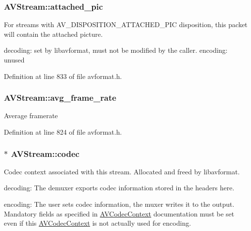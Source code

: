 \subsubsection[{\texorpdfstring{attached\+\_\+pic}{attached_pic}}]{ A\+V\+Stream\+::attached\+\_\+pic}\hypertarget{struct_a_v_stream_a8c689ee00c0dfe4313891f8a2ea21f4d}{}\label{struct_a_v_stream_a8c689ee00c0dfe4313891f8a2ea21f4d}
For streams with A\+V\+\_\+\+D\+I\+S\+P\+O\+S\+I\+T\+I\+O\+N\+\_\+\+A\+T\+T\+A\+C\+H\+E\+D\+\_\+\+P\+IC disposition, this packet will contain the attached picture.

decoding\+: set by libavformat, must not be modified by the caller. encoding\+: unused 

Definition at line 833 of file avformat.\+h.

\subsubsection[{\texorpdfstring{avg\+\_\+frame\+\_\+rate}{avg_frame_rate}}]{ A\+V\+Stream\+::avg\+\_\+frame\+\_\+rate}\hypertarget{struct_a_v_stream_a946e1e9b89eeeae4cab8a833b482c1ad}{}\label{struct_a_v_stream_a946e1e9b89eeeae4cab8a833b482c1ad}
Average framerate 

Definition at line 824 of file avformat.\+h.

\subsubsection[{\texorpdfstring{codec}{codec}}]{$\ast$ A\+V\+Stream\+::codec}\hypertarget{struct_a_v_stream_a56f20051fb99339cc588cd3a07ab8c96}{}\label{struct_a_v_stream_a56f20051fb99339cc588cd3a07ab8c96}
Codec context associated with this stream. Allocated and freed by libavformat.


\begin{DoxyItemize}
\item decoding\+: The demuxer exports codec information stored in the headers here.
\item encoding\+: The user sets codec information, the muxer writes it to the output. Mandatory fields as specified in \hyperlink{struct_a_v_codec_context}{A\+V\+Codec\+Context} documentation must be set even if this \hyperlink{struct_a_v_codec_context}{A\+V\+Codec\+Context} is not actually used for encoding. 
\end{DoxyItemize}

